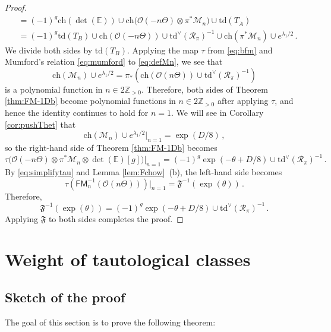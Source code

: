 \documentclass[11pt]{article}
\def\Mc{\mathcal{M}}
\def\CO{\mathcal{O}}
\def\ZZ{\mathbb{Z}}
\def\ch{\mathrm{ch}}
\def\Td{\mathrm{td}}
\def\cR{\mathcal{R}}
\def\FM{\mathsf{FM}}
\newcommand{\barA}{\overline{A}}
\theoremstyle{definition}
\begin{document}
\begin{proof}
\begin{align*}
    &=
    (-1)^g\ch(\det(\mathbb E))\cup\ch\big(\CO(-n\Theta) \otimes \pi^*\Mc_n\big)\cup\Td(T_{\barA})\\
    &=(-1)^g\Td(T_B)\cup \ch(\mathcal O(-n\Theta))\cup \Td^\vee(\cR_{\pi})^{-1}\cup \ch(\pi^*\mathcal M_n)\cup e^{\lambda_1/2}\,.
    \end{align*}
    We divide both sides by $\Td(T_B)$. Applying the map $\tau$ from \eqref{eq:bfm} and Mumford's relation \eqref{eq:mumford} to \eqref{eq:defMn}, we see that
    $$
    \ch(\mathcal M_n)\cup e^{\lambda_1/2} = \pi_*(\ch(\mathcal O(n\Theta))\cup\Td^\vee(\cR_{\pi})^{-1})
    $$
    is a polynomial function in $n \in 2\ZZ_{>0}$.
	Therefore, both sides of Theorem \ref{thm:FM-1Db} become polynomial functions in $n \in 2\ZZ_{>0}$ after applying $\tau$, and hence the identity continues to hold for $n=1$. We will see in Corollary \ref{cor:pushThet} that
    \begin{equation}\label{eq:evalMn1}
    \ch(\mathcal M_n) \cup e^{\lambda_1/2} \Big|_{n=1} = \exp(D/8)\, ,
    \end{equation}
    so the right-hand side of Theorem \ref{thm:FM-1Db} becomes
    $$
    \tau\big(\CO(-n\Theta) \otimes \pi^*\Mc_n\otimes \det (\mathbb E)[g]\big)\Big|_{n=1} = (-1)^g \exp(-\theta + D/8) \cup \Td^\vee (\cR_{\pi})^{-1}\,.
    $$
    By \eqref{eq:simplifytau} and Lemma \ref{lem:Fchow}~(b), the left-hand side becomes
    $$
    \tau(\FM_n^{-1}(\mathcal O(n\Theta))) \Big|_{n=1} = \mathfrak F^{-1}(\exp(\theta))\,.
    $$
    Therefore,
    $$
    \mathfrak F^{-1}(\exp(\theta)) = (-1)^g\exp(-\theta+D/8)\cup\Td^\vee(\cR_{\pi})^{-1}\, .
    $$
    Applying $\mathfrak F$ to both sides completes the proof.
\end{proof}

\section{Weight of tautological classes}\label{sec:wt}

\subsection{Sketch of the proof}\label{sec:wt_intro}

The goal of this section is to prove the following theorem:
\end{document}
